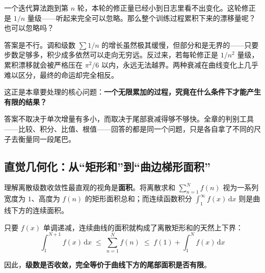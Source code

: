 一个迭代算法跑到第 \(n\) 轮，本轮的修正量已经小到日志里看不出变化。这轮修正是 \(1/n\) 量级——听起来完全可以忽略。那么整个训练过程累积下来的漂移量呢？也可以忽略吗？

答案是不行。调和级数 \(\sum 1/n\) 的增长虽然极其缓慢，但部分和是无界的——只要步数足够多，积少成多依然可以走向无穷远。反过来，若每轮修正是 \(1/n^2\) 量级，累积漂移就会被严格压在 \(\pi^2/6\) 以内，永远无法越界。两种衰减在曲线变化上几乎难以区分，最终的命运却完全相反。

这正是本章要处理的核心问题：\textbf{一个无限累加的过程，究竟在什么条件下才能产生有限的结果？}

答案不取决于单次增量有多小，而取决于尾部衰减得够不够快。全章的判别工具——比较、积分、比值、根值——回答的都是同一个问题，只是各自拿了不同的尺子去衡量同一段尾巴。

\subsection*{直觉几何化：从``矩形和''到``曲边梯形面积''}

理解离散级数收敛性最直观的视角是\textbf{面积}。将离散求和 \(\sum_{n=1}^N f(n)\) 视为一系列宽度为 \(1\)、高度为 \(f(n)\) 的矩形面积总和；而连续函数积分 \(\int_1^\infty f(x)\,\mathrm{d}x\) 则是曲线下方的连续面积。

只要 \(f(x)\) 单调递减，连续曲线的面积就构成了离散矩形和的天然上下界：
\begin{equation*}
\int_1^{N+1} f(x)\,\mathrm{d}x \;\le\; \sum_{n=1}^N f(n) \;\le\; f(1) + \int_1^N f(x)\,\mathrm{d}x
\end{equation*}

因此，\textbf{级数是否收敛，完全等价于曲线下方的尾部面积是否有限}。

